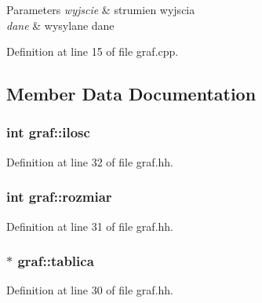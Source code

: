 \begin{DoxyParams}{\-Parameters}
{\em wyjscie} & strumien wyjscia \\
\hline
{\em dane} & wysylane dane \\
\hline
\end{DoxyParams}


\-Definition at line 15 of file graf.\-cpp.



\subsection{\-Member \-Data \-Documentation}
\hypertarget{classgraf_ad9204c0bbc75a2bef4a43200672f9694}{
\subsubsection[{ilosc}]{\setlength{\rightskip}{0pt plus 5cm}int {\bf graf\-::ilosc}}}\label{classgraf_ad9204c0bbc75a2bef4a43200672f9694}


\-Definition at line 32 of file graf.\-hh.

\hypertarget{classgraf_a596da8a77b680d7ec408b1253c2c43c3}{
\subsubsection[{rozmiar}]{\setlength{\rightskip}{0pt plus 5cm}int {\bf graf\-::rozmiar}}}\label{classgraf_a596da8a77b680d7ec408b1253c2c43c3}


\-Definition at line 31 of file graf.\-hh.

\hypertarget{classgraf_a028d547c797438718da6241a28b32db5}{
\subsubsection[{tablica}]{$\ast$ {\bf graf\-::tablica}}}\label{classgraf_a028d547c797438718da6241a28b32db5}


\-Definition at line 30 of file graf.\-hh.

